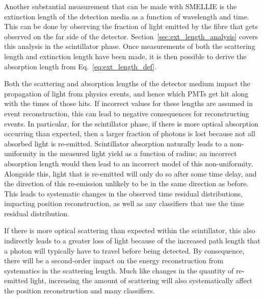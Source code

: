 Another substantial measurement that can be made with SMELLIE is the extinction length of the detection media as a function of wavelength and time. This can be done by observing the fraction of light emitted by the fibre that gets observed on the far side of the detector. Section~\ref{sec:ext_length_analysis} covers this analysis in the scintillator phase. Once measurements of both the scattering length and extinction length have been made, it is then possible to derive the absorption length from Eq.~\ref{eq:ext_length_def}.

Both the scattering and absorption lengths of the detector medium impact the propagation of light from physics events, and hence which PMTs get hit along with the times of those hits. If incorrect values for these lengths are assumed in event reconstruction, this can lead to negative consequences for reconstructing events. In particular, for the scintillator phase, if there is more optical absorption occurring than expected, then a larger fraction of photons is lost because not all absorbed light is re-emitted. Scintillator absorption naturally leads to a non-uniformity in the measured light yield as a function of radius; an incorrect absorption length would then lead to an incorrect model of this non-uniformity. Alongside this, light that is re-emitted will only do so after some time delay, and the direction of this re-emission unlikely to be in the same direction as before. This leads to systematic changes in the observed time residual distributions, impacting position reconstruction, as well as any classifiers that use the time residual distribution.

If there is more optical scattering than expected within the scintillator, this also indirectly leads to a greater loss of light because of the increased path length that a photon will typically have to travel before being detected. By consequence, there will be a second-order impact on the energy reconstruction from systematics in the scattering length. Much like changes in the quantity of re-emitted light, increasing the amount of scattering will also systematically affect the position reconstruction and many classifiers.


